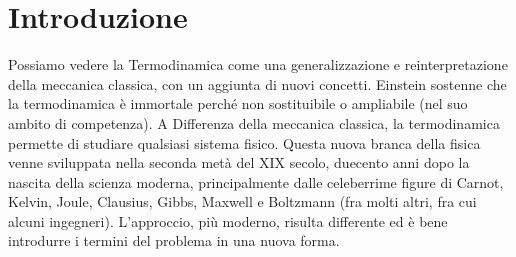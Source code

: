 \documentclass[
10pt, %
a4paper, %
oneside, %
headinclude,footinclude, %
BCOR5mm, %
]{scrartcl}
\begin{document}
\setcounter{tocdepth}{2} %






\newpage %
\tableofcontents %
\newpage

\section{Introduzione}
Possiamo vedere la Termodinamica come una generalizzazione e reinterpretazione della meccanica classica, con un aggiunta di nuovi concetti. Einstein sostenne che la termodinamica è immortale perché non sostituibile o ampliabile (nel suo ambito di competenza). A Differenza della meccanica classica, la termodinamica permette di studiare qualsiasi sistema fisico. Questa nuova branca della fisica venne sviluppata nella seconda metà del XIX secolo, duecento anni dopo la nascita della scienza moderna, principalmente dalle celeberrime figure di Carnot, Kelvin, Joule, Clausius, Gibbs, Maxwell e Boltzmann (fra molti altri, fra cui alcuni ingegneri). L'approccio, più moderno, risulta differente ed è bene introdurre i termini del problema in una nuova forma.\\
\end{document}
